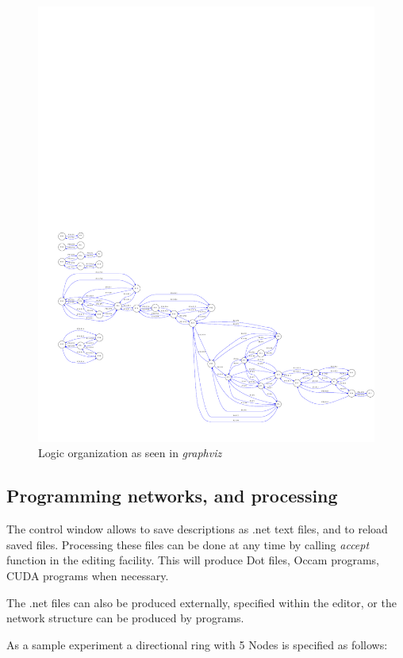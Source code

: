 \documentclass[times]{book}
\begin{document}
\begin{figure}[hbtp]
\begin{center} 
\includegraphics[width=12cm]{genRange100Points40-rogne.pdf}
\caption{Logic organization as seen in {\sl graphviz}}
\label{fig:genRange100Points40-rogne}
\end{center}
\end{figure}
 

\subsection{Programming networks, and processing}
\label{sec:ring5Def}
The control window allows to save descriptions as .net text files, and to reload saved files.
Processing these files can be done at any time by calling {\sl accept} function in 
the editing facility. This will produce Dot files, Occam programs, CUDA programs
when necessary.

The .net files can also be produced externally, specified within the editor, or the network structure
can be produced by programs. 

As a sample experiment  a directional ring with 5 Nodes is specified as follows:
\end{document}
